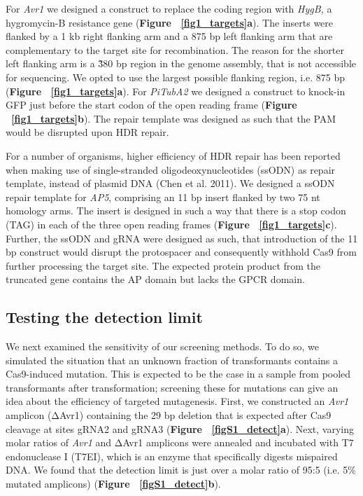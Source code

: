 \documentclass[onecolumn, 11pt,openany]{memoir}
\begin{document}
\begin{multicols}{2}
For \textit{Avr1} we designed a construct to replace the coding region with \textit{HygB, }a hygromycin-B resistance gene (\textbf{Figure ~\ref{fig1_targets}a}). The inserts were flanked by a 1 kb right flanking arm and a 875 bp left flanking arm that are complementary to the target site for recombination. The reason for the shorter left flanking arm is a \~ 380 bp region in the genome assembly, that is not accessible for sequencing. We opted to use the largest possible flanking region, i.e. 875 bp (\textbf{Figure ~\ref{fig1_targets}a}). For \textit{PiTubA2} we designed a construct to knock-in GFP just before the start codon of the open reading frame (\textbf{Figure ~\ref{fig1_targets}b}). The repair template was designed as such that the PAM would be disrupted upon HDR repair. 

For a number of organisms, higher efficiency of HDR repair has been reported when making use of single-stranded oligodeoxynucleotides (ssODN) as repair template, instead of plasmid DNA (Chen et al. 2011). We designed a ssODN repair template for \textit{AP5}, comprising an 11 bp insert flanked by two 75 nt homology arms. The insert is designed in such a way that there is a stop codon (TAG) in each of the three open reading frames (\textbf{Figure ~\ref{fig1_targets}c}). Further, the ssODN and gRNA were designed as such, that introduction of the 11 bp construct would disrupt the protospacer and consequently withhold Cas9 from further processing the target site. The expected protein product from the truncated gene contains the AP domain but lacks the GPCR domain.

\subsection{Testing the detection limit }
We next examined the sensitivity of our screening methods. To do so, we simulated the situation that an unknown fraction of transformants contains a Cas9-induced mutation. This is expected to be the case in a sample from pooled transformants after transformation; screening these for mutations can give an idea about the efficiency of targeted mutagenesis. First, we constructed an \textit{Avr1} amplicon (ΔAvr1) containing the 29 bp deletion that is expected after Cas9 cleavage at sites gRNA2 and gRNA3 (\textbf{Figure ~\ref{figS1_detect}a}). Next, varying molar ratios of \textit{Avr1} and ΔAvr1 amplicons were annealed and incubated with T7 endonuclease I (T7EI), which is an enzyme that specifically digests mispaired DNA. We found that the detection limit is just over a molar ratio of 95:5 (i.e. 5\% mutated amplicons) (\textbf{Figure ~\ref{figS1_detect}b}).


\end{multicols}
\end{document}
